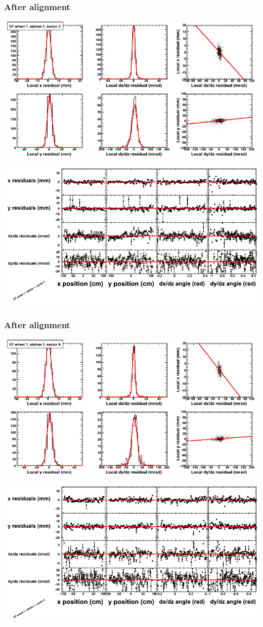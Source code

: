 \documentclass[compress]{beamer}
\begin{document}
\begin{frame}
\frametitle{After alignment}
\includegraphics[width=0.7\linewidth]{NOV4_fitfunctions/MBwhDst1sec03_bellcurves.png}

\includegraphics[width=0.7\linewidth]{NOV4_fitfunctions/MBwhDst1sec03_polynomials.png}
\end{frame}

\begin{frame}
\frametitle{After alignment}
\includegraphics[width=0.7\linewidth]{NOV4_fitfunctions/MBwhDst1sec04_bellcurves.png}

\includegraphics[width=0.7\linewidth]{NOV4_fitfunctions/MBwhDst1sec04_polynomials.png}
\end{frame}
\end{document}
